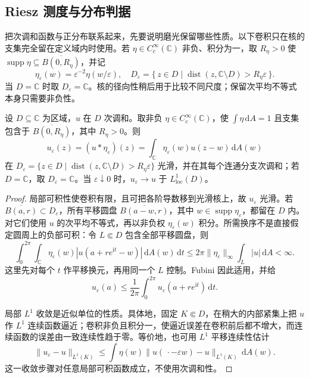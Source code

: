 \subsection{Riesz 测度与分布判据}
\label{b3:subsec:150403}

把次调和函数与正分布联系起来，先要说明磨光保留哪些性质。以下卷积只在核的支集完全留在定义域内时使用。若 \(\eta\in C_c^\infty(\mathbb C)\) 非负、积分为一，取 \(R_\eta>0\) 使 \(\operatorname{supp}\eta\subseteq\overline{B(0,R_\eta)}\)，并记
\[
 \eta_\varepsilon(w)=\varepsilon^{-2}\eta(w/\varepsilon),
 \quad
 D_\varepsilon=\{\,z\in D\mid
 \operatorname{dist}(z,\mathbb C\setminus D)>R_\eta\varepsilon\,\}.
\]
当 \(D=\mathbb C\) 时取 \(D_\varepsilon=\mathbb C\)。核的径向性稍后用于比较不同尺度；保留次平均不等式本身只需要非负性。

\begin{lemma}[次调和函数的磨光]\label{b3:lem:15-subharmonic-smoothing}
设 \(D\subseteq\mathbb C\) 为区域，\(u\) 在 \(D\) 次调和。取非负 \(\eta\in C_c^\infty(\mathbb C)\)，使 \(\int\eta\,\mathrm{d}A=1\) 且支集包含于 \(\overline{B(0,R_\eta)}\)，其中 \(R_\eta>0\)。则
\[
 u_\varepsilon(z)=(u*\eta_\varepsilon)(z)
 =\int_{\mathbb C}\eta_\varepsilon(w)u(z-w)\,\mathrm{d}A(w)
\]
在 \(D_\varepsilon=\{z\in D\mid\operatorname{dist}(z,\mathbb C\setminus D)>R_\eta\varepsilon\}\) 光滑，并在其每个连通分支次调和；若 \(D=\mathbb C\)，取 \(D_\varepsilon=\mathbb C\)。当 \(\varepsilon\downarrow0\) 时，\(u_\varepsilon\to u\) 于 \(L^1_{\mathrm{loc}}(D)\)。
\end{lemma}
\begin{proof}
局部可积性使卷积有限，且可把各阶导数移到光滑核上，故 \(u_\varepsilon\) 光滑。若 \(\overline{B(a,r)}\subset D_\varepsilon\)，所有平移圆盘 \(\overline{B(a-w,r)}\)，其中 \(w\in\operatorname{supp}\eta_\varepsilon\)，都留在 \(D\) 内。对它们使用 \(u\) 的次平均不等式，再以非负权 \(\eta_\varepsilon(w)\) 积分。所需换序不是直接假定圆周上的负部可积：令 \(L\Subset D\) 包含全部平移圆盘，则
\[
 \int_0^{2\pi}\int_{\mathbb C}
 \eta_\varepsilon(w)|u(a+re^{\mathrm{i}t}-w)|\,\mathrm{d}A(w)\,\mathrm{d}t
 \le2\pi\|\eta_\varepsilon\|_\infty\int_L|u|\,\mathrm{d}A<\infty.
\]
这里先对每个 \(t\) 作平移换元，再用同一个 \(L\) 控制。Fubini 因此适用，并给
\[
 u_\varepsilon(a)\le\frac1{2\pi}
 \int_0^{2\pi}u_\varepsilon(a+re^{\mathrm{i}t})\,\mathrm{d}t.
\]

局部 \(L^1\) 收敛是近似单位的性质。具体地，固定 \(K\Subset D\)，在稍大的内部紧集上把 \(u\) 作 \(L^1\) 连续函数逼近；卷积非负且积分一，使逼近误差在卷积前后都不增大，而连续函数的误差由一致连续性趋于零。等价地，也可用 \(L^1\) 平移连续性估计
\[
 \|u_\varepsilon-u\|_{L^1(K)}
 \le\int\eta(w)\|u(\,\cdot-\varepsilon w)-u\|_{L^1(K)}\,\mathrm{d}A(w).
\]
这一收敛步骤对任意局部可积函数成立，不使用次调和性。
\end{proof}


